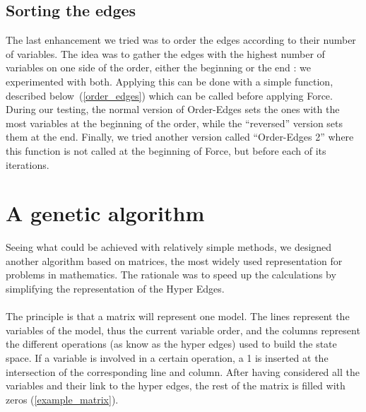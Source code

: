 \documentclass[12pt]{report}
\begin{document}
\newpage
\section{Sorting the edges} \label{sec:order_edges}

The last enhancement we tried was to order the edges according to their number of variables. The idea was to gather the edges with the highest number of variables on one side of the order, either the beginning or the end : we experimented with both. Applying this can be done with a simple function, described below~(\ref{order_edges}) which can be called before applying Force. During our testing, the normal version of Order-Edges sets the ones with the most variables at the beginning of the order, while the \enquote{reversed} version sets them at the end.
Finally, we tried another version called \enquote{Order-Edges 2} where this function is not called at the beginning of Force, but before each of its iterations.

\begin{algorithm}
  \begin{algorithmic}[1]
    \EndFunction
    \label{order_edges}
  \end{algorithmic}
\end{algorithm}

\chapter{A genetic algorithm}

Seeing what could be achieved with relatively simple methods, we designed another algorithm based on matrices, the most widely used representation for problems in mathematics. The rationale was to speed up the calculations by simplifying the representation of the Hyper Edges.
\\\\
The principle is that a matrix will represent one model. The lines represent the variables of the model, thus the current variable order, and the columns represent the different operations (as know as the hyper edges) used to build the state space. If a variable is involved in a certain operation, a 1 is inserted at the intersection of the corresponding line and column. After having considered all the variables and their link to the hyper edges, the rest of the matrix is filled with zeros (\ref{example_matrix}).
\end{document}
